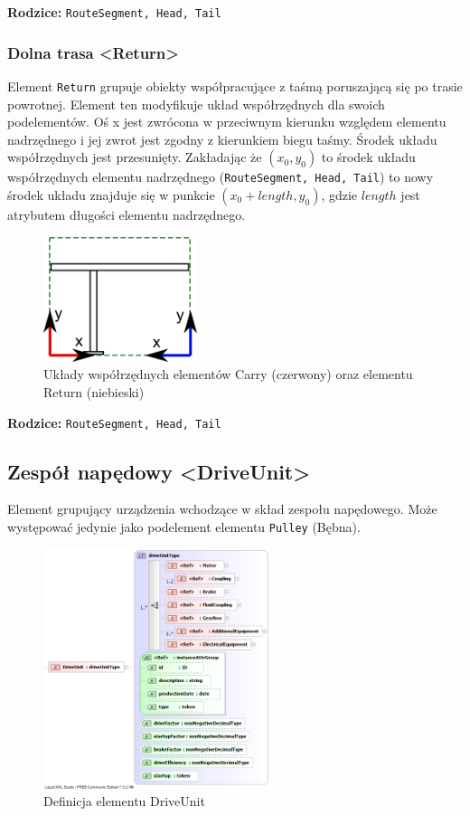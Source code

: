 \documentclass[12pt,a4paper]{article}
\begin{document}
\noindent\textbf{Rodzice:} \texttt{RouteSegment, Head, Tail}


\subsubsection{Dolna trasa <Return>}
Element {\tt Return} grupuje obiekty współpracujące z taśmą poruszającą się po
trasie powrotnej.  Element ten modyfikuje układ współrzędnych dla swoich
podelementów.  Oś x jest zwrócona w przeciwnym kierunku względem elementu
nadrzędnego i jej zwrot jest zgodny z kierunkiem biegu taśmy.  Środek układu
współrzędnych jest przesunięty.  Zakładając że $(x_0, y_0)$ to środek układu
współrzędnych elementu nadrzędnego ({\tt RouteSegment, Head, Tail}) to nowy
środek układu znajduje się w punkcie $(x_0 + {length}, y_0)$, gdzie ${length}$
jest atrybutem długości elementu nadrzędnego.

\begin{figure}[H]
  \centering
  \includegraphics[width=0.4\textwidth]{png/carryReturn_drw}
  \caption{Układy współrzędnych elementów Carry (czerwony) oraz
elementu Return (niebieski)}
  \label{fig:carryReturn-drw}
\end{figure}

\noindent\textbf{Rodzice:} \texttt{RouteSegment, Head, Tail}

\subsection{Zespół napędowy <DriveUnit>}
Element grupujący urządzenia wchodzące w skład zespołu napędowego. Może
występować jedynie jako podelement elementu {\tt Pulley} (Bębna).

\begin{figure}[H]
  \centering
  \includegraphics[width=0.6\textwidth]{png/liquid/DriveUnit}
  \caption{Definicja elementu DriveUnit}
  \label{fig:driveUnit-xsd}
\end{figure}
\end{document}
